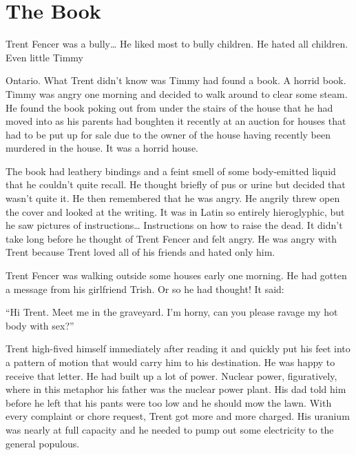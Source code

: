 \chapter{The Book}


Trent Fencer was a bully{\ldots} He liked most to bully children. He
hated all children. Even little Timmy

Ontario. What Trent didn't know was Timmy had found a book. A
horrid book. Timmy was angry one morning and decided to walk around
to clear some steam. He found the book poking out from under the
stairs of the house that he had moved into as his parents had
boughten it recently at an auction for houses that had to be put up
for sale due to the owner of the house having recently been
murdered in the house. It was a horrid house.



The book had leathery bindings and a feint smell of some
body-emitted liquid that he couldn't quite recall. He thought briefly of
pus or urine but decided that wasn't quite it. He then remembered
that he was angry. He angrily threw open the cover and looked at
the writing. It was in Latin so entirely hieroglyphic, but he saw
pictures of instructions{\ldots} Instructions on how to raise the dead.
It didn't take long before he thought of Trent Fencer and felt
angry. He was angry with Trent because Trent loved all of his
friends and hated only him.



Trent Fencer was walking outside some houses early one morning. He
had gotten a message from his girlfriend Trish. Or so he had
thought! It said:



``Hi Trent. Meet me in the graveyard. I'm horny, can you please
ravage my hot body with sex?''



Trent high-fived himself immediately after reading it and quickly
put his feet into a pattern of motion that would carry him to his
destination. He was happy to receive that letter. He had built up a
lot of power. Nuclear power, figuratively, where in this metaphor
his father was the nuclear power plant. His dad told him before he
left that his pants were too low and he should mow the lawn. With
every complaint or chore request, Trent got more and more charged.
His uranium was nearly at full capacity and he needed to pump out
some electricity to the general populous.



